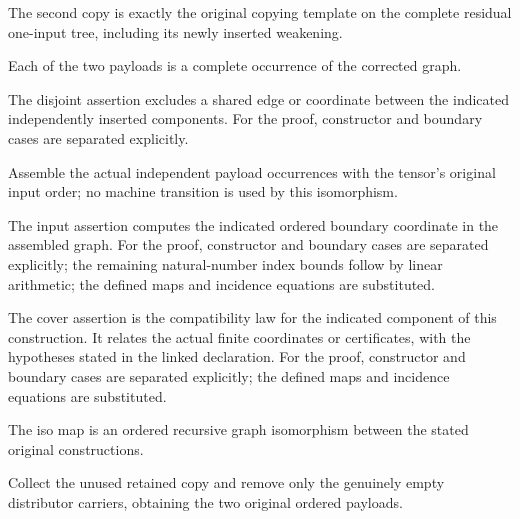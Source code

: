 The second copy is exactly the original copying template on the complete residual one-input tree, including its newly inserted weakening.
\par{}

Each of the two payloads is a complete occurrence of the corrected graph.
\par{}

The disjoint assertion excludes a shared edge or coordinate between the indicated independently inserted components.
For the proof, constructor and boundary cases are separated explicitly.
\par{}

Assemble the actual independent payload occurrences with the tensor's original input order; no machine transition is used by this isomorphism.
\par{}

The input assertion computes the indicated ordered boundary coordinate in the assembled graph.
For the proof, constructor and boundary cases are separated explicitly; the remaining natural-number index bounds follow by linear arithmetic; the defined maps and incidence equations are substituted.
\par{}

The cover assertion is the compatibility law for the indicated component of this construction. It relates the actual finite coordinates or certificates, with the hypotheses stated in the linked declaration.
For the proof, constructor and boundary cases are separated explicitly; the defined maps and incidence equations are substituted.
\par{}

The iso map is an ordered recursive graph isomorphism between the stated original constructions.
\par{}

Collect the unused retained copy and remove only the genuinely empty distributor carriers, obtaining the two original ordered payloads.
\par{}

